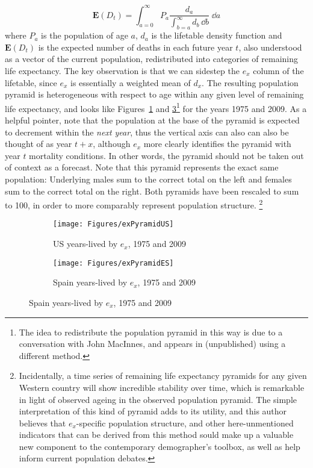 \begin{equation}
\mathbf{E}(D_t) = \int _{a = 0} ^{\infty} P_a \frac{d_a}{\int _{b = a} ^{\infty}
d_b\, \dd b} \;\dd a
\end{equation}
where $P_a$ is the population of age $a$, $d_a$ is the
lifetable density function and $\mathbf{E}(D_t)$ is the expected number of
deaths in each future year $t$, also understood as a vector of the current 
population, redistributed into categories of remaining life expectancy. The key
observation is that we can sidestep the $e_x$ column of the lifetable, since
$e_x$ is essentially a weighted mean of $d_x$. The resulting population pyramid
is heterogeneous with respect to age within any given level of remaining life
expectancy, and looks like
Figures~\ref{fig:exPyrUS} and \ref{fig:exPyrES}\footnote{The idea to
redistribute the population pyramid in this way is due to a conversation with 
John MacInnes, and appears in \citep{MacInnes2013pop} (unpublished) using a
different method.} for the years 1975 and 2009. As a helpful pointer, note
that the population at the base of the pyramid is expected to decrement
within the \textit{next year}, thus the vertical axis can also can also be
thought of as year $t+x$, although $e_x$ more clearly identifies the pyramid
with year $t$ mortality conditions. In other words, the pyramid should not be
taken out of context as a forecast. Note that this pyramid represents the
exact same population: Underlying males sum to the correct total on the left and
females sum to the correct total on the right. Both pyramids have been rescaled to sum to 100, in 
order to more comparably represent population structure. \footnote{Incidentally,
a time series of remaining life expectancy pyramids for any given Western country will show 
 incredible stability over time, which is remarkable in light of
 observed ageing in the observed population pyramid. The simple interpretation
 of this kind of pyramid adds to its utility, and this author believes that $e_x$-specific
 population structure, and other here-unmentioned indicators that can be derived
 from this method sould make up a valuable new component to the contemporary
 demographer's toolbox, as well as help inform current population debates.}

\begin{figure}
        \centering
        \begin{subfigure}
                \centering
                \caption{US years-lived by $e_x$, 1975 and 2009}
                \texttt{[image: Figures/exPyramidUS]}
                \label{fig:exPyrUS}
        \end{subfigure}
        \begin{subfigure}
                \centering
                \caption{Spain years-lived by $e_x$, 1975 and 2009}
                \texttt{[image: Figures/exPyramidES]}
               
                \label{fig:exPyrES}
        \end{subfigure}
\end{figure}

